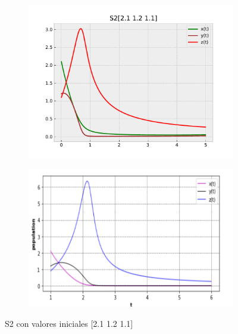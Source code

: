 \documentclass{wscpaperproc}
\theoremstyle{wsc}
\begin{document}
\begin{figure}[h]
	\centering
	\begin{subfigure}[b]{0.5\textwidth}
		\centering
		\includegraphics[width=\textwidth]{Simulations/S2[2.1 1.2 1.1].pdf}
	
		\label{fig:comparativa61}
	\end{subfigure}%
	\begin{subfigure}[b]{0.5\textwidth}
		\centering
		\includegraphics[width=\textwidth]{GraficasPaper/S2[3].png}
		\label{fig:comparativa62}
	\end{subfigure}
	\caption{S2 con valores iniciales [2.1 1.2 1.1]}

	\label{fig:comparacion7}
\end{figure}
\end{document}
